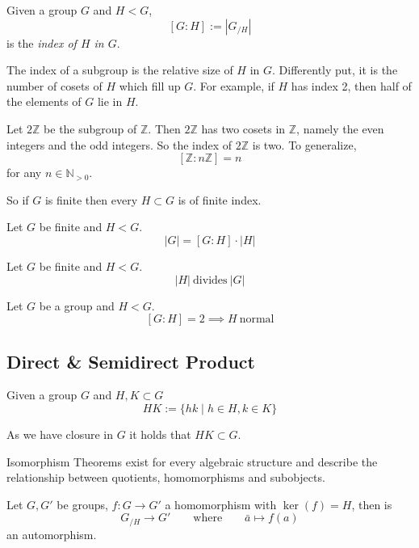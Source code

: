 \begin{definition}
   Given a group \(G\) and \(H < G\),
   \[[G:H] := |G_{/H}|\]
   is the \emph{index of \(H\) in \(G\)}.
\end{definition}
\begin{remark}[Intuition]
   The index of a subgroup is the relative size of \(H\) in \(G\).
   Differently put, it is the number of cosets of \(H\) which fill up \(G\).
   For example, if \(H\) has index 2, then half of the elements of \(G\) lie in \(H\).
\end{remark}
\begin{example}
   Let \(2\mathbb{Z}\) be the subgroup of \(\mathbb{Z}\).
   Then \(2\mathbb{Z}\) has two cosets in \(\mathbb{Z}\), namely the even integers and the odd integers.
   So the index of \(2\mathbb{Z}\) is two.
   To generalize,
   \[[\mathbb{Z} : n\mathbb{Z}] = n\]
   for any \(n \in \mathbb{N}_{>0}\).
\end{example}
\begin{remark}
   So if \(G\) is finite then every \(H \subset G\) is of finite index.
\end{remark}

\begin{proposition}\label{pro:index_formula}
   Let \(G\) be finite and \(H < G\).
   \[|G| = [G:H] \cdot |H|\]
\end{proposition}

\begin{corollary}
   Let \(G\) be finite and \(H < G\).
   \[|H|~\text{divides}~|G|\]
\end{corollary}

\begin{proposition}
   Let \(G\) be a group and \(H < G\).
   \[[G:H] = 2 \implies H~\text{normal}\]
\end{proposition}

\subsection{Direct \& Semidirect Product}
\begin{definition}
   Given a group \(G\) and \(H, K \subset G\)
   \[HK := \{hk \mid h \in H, k \in K\}\]
\end{definition}
\begin{remark}
   As we have closure in \(G\) it holds that \(HK \subset G\).
\end{remark}

Isomorphism Theorems exist for every algebraic structure and describe the relationship between quotients, homomorphisms and subobjects.
\begin{proposition}
   Let \(G, G'\) be groups, \(f: G \to G'\) a homomorphism with \(\ker(f) = H\), then is
   \[G_{/H} \to G' \qquad\text{where}\qquad \bar{a} \mapsto f(a)\]
   an automorphism.
\end{proposition}

